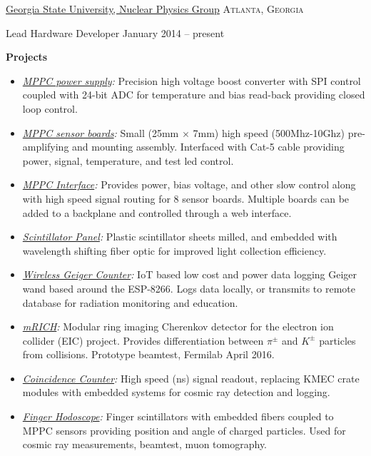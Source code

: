 \documentclass[10pt,letterpaper]{article}
\begin{document}
\headedsection  %
  {\href{http://phynp6.phy-astr.gsu.edu}{Georgia State University, Nuclear Physics Group}}
  {\textsc{Atlanta, Georgia}} {
  \headedsubsection
    {Lead Hardware Developer}
    {January 2014 -- present}
    {
    \textbf{Projects}
    \begin{itemize}
      \renewcommand\labelitemi{--}
      \item \emph{\href{https://github.com/Sawaiz/mppcHighVoltage}{MPPC power supply}:}
        Precision high voltage boost converter with SPI control coupled with 24-bit ADC for temperature and bias read-back providing closed loop control.
      \item \emph{\href{https://github.com/Sawaiz/mppcSensor}{MPPC sensor boards}:}
        Small (25mm $\times$ 7mm) high speed (500Mhz-10Ghz) pre-amplifying and mounting assembly. Interfaced with Cat-5 cable providing power, signal, temperature, and test led control.
      \item \emph{\href{https://github.com/Sawaiz/mppcInterface}{MPPC Interface}:}
        Provides power, bias voltage, and other slow control along with high speed signal routing for 8 sensor boards. Multiple boards can be added to a backplane and controlled through a web interface.
      \item \emph{\href{https://github.com/Sawaiz/scintillatorPanel}{Scintillator Panel}:}
        Plastic scintillator sheets milled, and embedded with wavelength shifting fiber optic for improved light collection efficiency.
      \item \emph{\href{https://github.com/Sawaiz/wirelessGeigerCounter}{Wireless Geiger Counter}:}
        IoT based low cost and power data logging Geiger wand based around the ESP-8266. Logs data locally, or transmits to remote database for radiation monitoring and education.
      \item \emph{\href{https://github.com/Sawaiz/modularRICH}{mRICH}:}
        Modular ring imaging Cherenkov detector for the electron ion collider (EIC) project. Provides differentiation between $\pi^\pm$ and $K^\pm$ particles from collisions. Prototype beamtest, Fermilab April 2016.
      \item \emph{\href{https://github.com/Sawaiz/coincidenceCounter}{Coincidence Counter}:}
        High speed (ns) signal readout, replacing KMEC crate modules with embedded systems for cosmic ray detection and logging.
      \item \emph{\href{https://github.com/Sawaiz/modularHodoscope}{Finger Hodoscope}:}
        Finger scintillators with embedded fibers coupled to MPPC sensors providing position and angle of charged particles. Used for cosmic ray measurements, beamtest, muon tomography.
    \end{itemize}
    }
}
\end{document}
